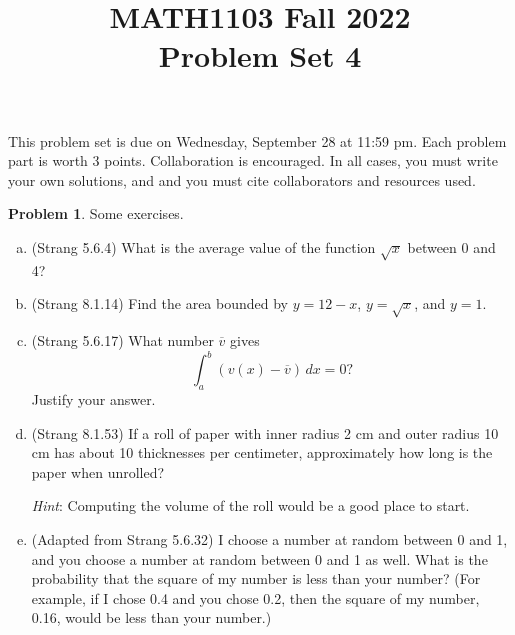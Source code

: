 \documentclass[11pt,oneside]{amsart}
\title{MATH1103 Fall 2022\\
Problem Set 4}
\theoremstyle{definition}
\newtheorem{problem}{Problem}
\begin{document}
    \maketitle
    This problem set is due on Wednesday, September 28 at 11:59 pm. Each problem part is worth 3 points. Collaboration is encouraged. In all cases, you must write your own solutions, and and you must cite collaborators and resources used.


    \begin{problem}
        Some exercises.
        \begin{enumerate}[(a)]
            \item (Strang 5.6.4) What is the average value of the function $\sqrt x$ between 0 and 4?
            \item (Strang 8.1.14) Find the area bounded by $y=12-x$, $y=\sqrt x$, and $y=1$.
            \item (Strang 5.6.17) What number $\overline v$ gives
            \[\int_a^b(v(x)-\overline v)\,dx=0?\]
            Justify your answer.
            \item (Strang 8.1.53) If a roll of paper with inner radius 2 cm and outer radius 10 cm has about 10 thicknesses per centimeter, approximately how long is the paper when unrolled?
        
            \emph{Hint}: Computing the volume of the roll would be a good place to start.

            \item (Adapted from Strang 5.6.32) I choose a number at random between 0 and 1, and you choose a number at random between 0 and 1 as well. What is the probability that the square of my number is less than your number? (For example, if I chose 0.4 and you chose 0.2, then the square of my number, 0.16, would be less than your number.)
        \end{enumerate}
    \end{problem}
\end{document}
